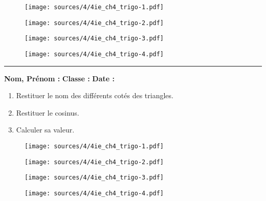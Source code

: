 \documentclass[10pt]{article}
\newcommand{\horrule}[1]{\rule{\linewidth}{#1}} %
\newcommand{\Pointille}[1][3]{\multido{}{#1}{ \makebox[\linewidth]{\dotfill}\\[\parskip]}}
\begin{document}
\begin{multicols}{4}

  \begin{figure}[H]
    \centering
    \texttt{[image: sources/4/4ie\_ch4\_trigo-1.pdf]}
  \end{figure}

  \begin{figure}[H]
    \centering
    \texttt{[image: sources/4/4ie\_ch4\_trigo-2.pdf]}
  \end{figure}


  \begin{figure}[H]
    \centering
    \texttt{[image: sources/4/4ie\_ch4\_trigo-3.pdf]}
  \end{figure}


  \begin{figure}[H]
    \centering
    \texttt{[image: sources/4/4ie\_ch4\_trigo-4.pdf]}
  \end{figure}

\end{multicols}
\Pointille[6]

\horrule{0.1ex}
\vspace{0.3cm}

\textbf{Nom, Prénom :} \hspace{8cm} \textbf{Classe :} \hspace{3cm} \textbf{Date :}\\

\setlength{\columnseprule}{0pt}
\begin{multicols}{2}
\begin{enumerate}
\item[1.] Restituer le nom des différents cotés des triangles.
\item[2.] Restituer le cosinus.
\item[3.] Calculer sa valeur.
\end{enumerate}
\end{multicols}

\begin{multicols}{4}

  \begin{figure}[H]
    \centering
    \texttt{[image: sources/4/4ie\_ch4\_trigo-1.pdf]}
  \end{figure}

  \begin{figure}[H]
    \centering
    \texttt{[image: sources/4/4ie\_ch4\_trigo-2.pdf]}
  \end{figure}


  \begin{figure}[H]
    \centering
    \texttt{[image: sources/4/4ie\_ch4\_trigo-3.pdf]}
  \end{figure}


  \begin{figure}[H]
    \centering
    \texttt{[image: sources/4/4ie\_ch4\_trigo-4.pdf]}
  \end{figure}

\end{multicols}
\Pointille[6]
\end{document}
